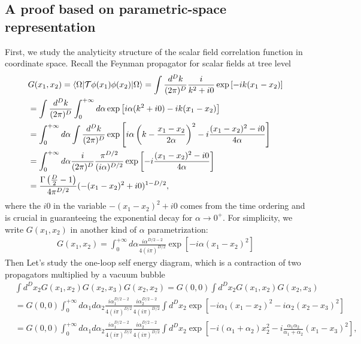 \documentclass[a4paper,11pt]{article}
\begin{document}
\subsection{A proof based on parametric-space representation}
First, we study the analyticity structure of the scalar field correlation function in coordinate space. Recall the Feynman propagator for scalar fields at tree level
\begin{align}
&G(x_1,x_2)=\langle \Omega | {\cal T} \phi(x_1) \phi(x_2) | \Omega \rangle = \int \frac{d^{D} k}{(2\pi)^D} \frac{i}{k^2+i 0} \exp\left[-i k (x_1-x_2)\right]\nonumber\\
&= \int \frac{d^{D} k}{(2\pi)^D} \int_{0}^{+\infty} d \alpha \exp \left[i \alpha (k^2+i 0) - i k (x_1-x_2)\right]\nonumber\\
&= \int_{0}^{+\infty} d \alpha \int \frac{d^{D} k}{(2\pi)^D} \exp \left[i \alpha \left(k-\frac{x_1-x_2}{2\alpha}\right)^2 - i \frac{(x_1-x_2)^2-i 0}{4 \alpha} \right]\nonumber\\
&= \int_{0}^{+\infty} d \alpha \frac{i}{(2\pi)^D}\frac{\pi^{D/2}}{(i \alpha)^{D/2}} \exp \left[- i \frac{(x_1-x_2)^2-i 0}{4 \alpha} \right]\nonumber\\
&= \frac{\Gamma  \left(\frac{D}{2}-1\right)}{4\pi^{D/2}} (-(x_1-x_2)^2+i 0)^{1-D/2},
\end{align}
where the $i0$ in the variable $-(x_1-x_2)^2+i0$ comes from the time ordering and is crucial in guaranteeing the exponential decay for $\alpha \rightarrow 0^{+}$. 
\iffalse
For simplicity, we write $G(x_1,x_2)$ in another kind of $\alpha$ parametrization:
\begin{align}
G(x_1,x_2) = \int_{0}^{+\infty} d \alpha \frac{i \alpha^{D/2-2}}{4 (i \pi)^{D/2}} \exp\left[-i \alpha (x_1-x_2)^2\right]
\end{align}
Then Let's study the one-loop self energy diagram, which is a contraction of two propagators multiplied by a vacuum bubble
\begin{align}
&\int d^{D} x_2 G(x_1,x_2) G(x_2,x_3) G(x_2,x_2) = G(0,0) \int d^{D} x_2 G(x_1,x_2) G(x_2,x_3) \nonumber\\
&= G(0,0) \int_{0}^{+\infty} d \alpha_1 d \alpha_2 \frac{i \alpha_1^{D/2-2}}{4 (i \pi)^{D/2}} \frac{i \alpha_2^{D/2-2}}{4 (i \pi)^{D/2}} \int d^{D} x_2 \exp\left[-i \alpha_1 (x_1-x_2)^2-i \alpha_2 (x_2-x_3)^2\right] \nonumber\\
&=G(0,0) \int_{0}^{+\infty} d \alpha_1 d \alpha_2 \frac{i \alpha_1^{D/2-2}}{4 (i \pi)^{D/2}} \frac{i \alpha_2^{D/2-2}}{4 (i \pi)^{D/2}} \int d^{D} x_2 \exp\left[-i (\alpha_1+\alpha_2) x_2^2 -i \frac{\alpha_1 \alpha_2}{\alpha_1+\alpha_2}(x_1-x_3)^2\right],
\end{align}
\end{document}
